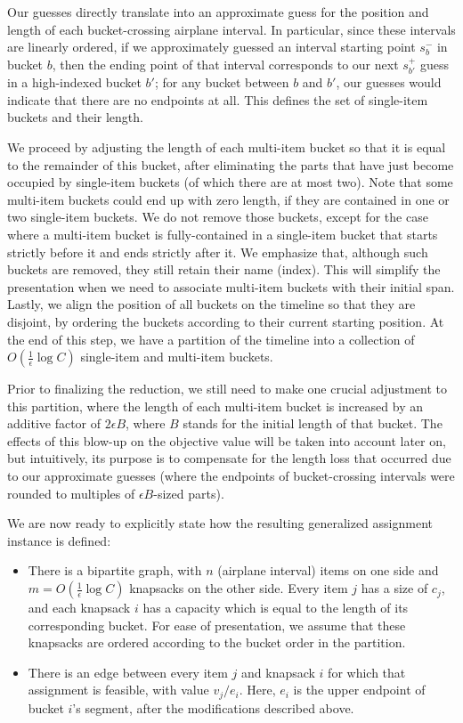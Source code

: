 \documentclass[11pt]{article}
\theoremstyle{plain}
\theoremstyle{definition}
\begin{document}
\smallskip {} Our guesses directly translate into an approximate guess for the position and length of each bucket-crossing airplane interval. In particular, since these intervals are linearly ordered, if we approximately guessed an interval starting point $s_{b}^-$ in bucket $b$, then the ending point of that interval corresponds to our next $s_{b'}^+$ guess in a high-indexed bucket $b'$; for any bucket between $b$ and $b'$, our guesses would indicate that there are no endpoints at all. This defines the set of single-item buckets and their length.

We proceed by adjusting the length of each multi-item bucket so that it is equal to the remainder of this bucket, after eliminating the parts that have just become occupied by single-item buckets (of which there are at most two). Note that some multi-item buckets could end up with zero length, if they are contained in one or two single-item buckets. We do not remove those buckets, except for the case where a multi-item bucket is fully-contained in a single-item bucket that starts strictly before it and ends strictly after it. We emphasize that, although such buckets are removed, they still retain their name (index). This will simplify the presentation when we need to associate multi-item buckets with their initial span.
Lastly, we align the position of all buckets on the timeline so that they are disjoint, by ordering the buckets according to their current starting position. At the end of this step, we have a partition of the timeline into a collection of $O( \frac{ 1 }{ \epsilon } \log C)$ single-item and multi-item buckets.

Prior to finalizing the reduction, we still need to make one crucial adjustment to this partition, where the length of each multi-item bucket is increased by an additive factor of $2 \epsilon B$, where $B$ stands for the initial length of that bucket. The effects of this blow-up on the objective value will be taken into account later on, but intuitively, its purpose is to compensate for the length loss that occurred due to our approximate guesses (where the endpoints of bucket-crossing intervals were rounded to multiples of $\epsilon B$-sized parts).

\smallskip {} We are now ready to explicitly state how the resulting generalized assignment instance is defined:
\begin{itemize}
\item There is a bipartite graph, with $n$ (airplane interval) items on one side and $m = O( \frac{ 1 }{ \epsilon } \log C)$ knapsacks on the other side. Every item $j$ has a size of $c_j$, and each knapsack $i$ has a capacity which is equal to the length of its corresponding bucket. For ease of presentation, we assume that these knapsacks are ordered according to the bucket order in the partition.

\item There is an edge between every item $j$ and knapsack $i$ for which that assignment is feasible, with value $v_j / e_i$. Here, $e_i$ is the upper endpoint of bucket $i$'s segment, after the modifications described above.
\end{itemize}
\end{document}
